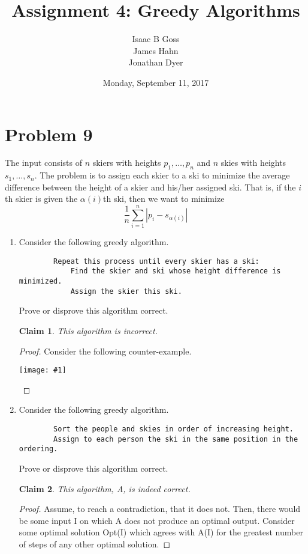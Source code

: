 \documentclass{article}
\author{Isaac B Goss\\ James Hahn\\ Jonathan Dyer}
\title{Assignment 4: Greedy Algorithms}
\date{Monday, September 11, 2017}
\newtheorem{thm}{Claim}
\providecommand{\prob}[1]{\section*{Problem #1}}
\providecommand{\image}[1]{
    \begin{center}
        \texttt{[image: \#1]}
    \end{center}
}
\begin{document}
\maketitle

    \prob{9}
    The input consists of $n$ skiers with heights $p_1,\dots,p_n$ and $n$ skies with heights $s_1,\dots,s_n$.
    The problem is to assign each skier to a ski to minimize the average difference between the height of a skier and his/her assigned ski.
    That is, if the $i$th skier is given the $\alpha(i)$th ski, then we want to minimize
    $$ \frac{1}{n} \sum_{i=1}^n |p_i - s_{\alpha(i)} | $$
    
    \begin{enumerate}[label=(\alph*)]
        \item Consider the following greedy algorithm.
        \begin{lstlisting}
        Repeat this process until every skier has a ski:
            Find the skier and ski whose height difference is minimized.
            Assign the skier this ski.
        \end{lstlisting}
        Prove or disprove this algorithm correct.
        
        \begin{thm}
            This algorithm is incorrect.
        \end{thm}
        \begin{proof}
            Consider the following counter-example.
            \image{p9table}
        \end{proof}
        
        \pagebreak %
        \item Consider the following greedy algorithm.
        \begin{lstlisting}
        Sort the people and skies in order of increasing height.
        Assign to each person the ski in the same position in the ordering.
        \end{lstlisting}
        Prove or disprove this algorithm correct.
        
        \begin{thm}
            This algorithm, A, is indeed correct.
        \end{thm}
        \begin{proof}
            Assume, to reach a contradiction, that it does not.
            Then, there would be some input I on which A does not produce an optimal output.
            Consider some optimal solution Opt(I) which agrees with A(I) for the greatest number of steps of any other optimal solution.
            

\end{proof}
\end{enumerate}
\end{document}
